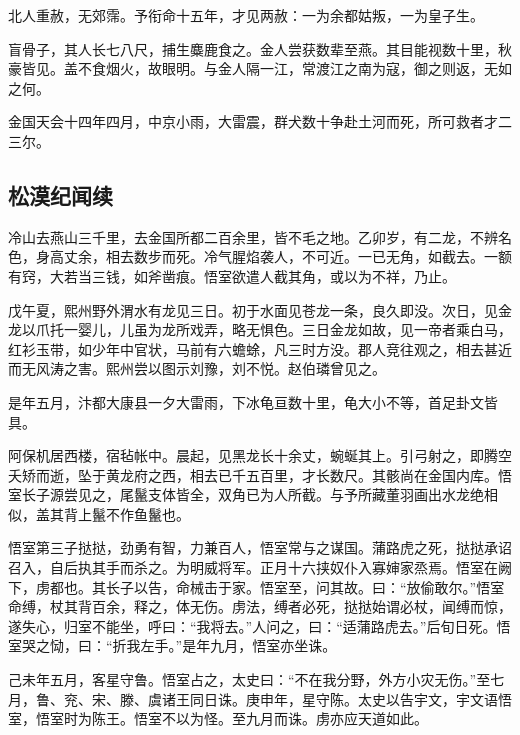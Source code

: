 \documentclass[]{article}
\begin{document}
北人重赦，无郊霈。予衔命十五年，才见两赦：一为余都姑叛，一为皇子生。

盲骨子，其人长七八尺，捕生麋鹿食之。金人尝获数辈至燕。其目能视数十里，秋豪皆见。盖不食烟火，故眼明。与金人隔一江，常渡江之南为寇，御之则返，无如之何。

金国天会十四年四月，中京小雨，大雷震，群犬数十争赴土河而死，所可救者才二三尔。

\hypertarget{header-n17}{%
\subsection{松漠纪闻续}\label{header-n17}}

冷山去燕山三千里，去金国所都二百余里，皆不毛之地。乙卯岁，有二龙，不辨名色，身高丈余，相去数步而死。冷气腥焰袭人，不可近。一已无角，如截去。一额有窍，大若当三钱，如斧凿痕。悟室欲遣人截其角，或以为不祥，乃止。

戊午夏，熙州野外渭水有龙见三日。初于水面见苍龙一条，良久即没。次日，见金龙以爪托一婴儿，儿虽为龙所戏弄，略无惧色。三日金龙如故，见一帝者乘白马，红衫玉带，如少年中官状，马前有六蟾蜍，凡三时方没。郡人竞往观之，相去甚近而无风涛之害。熙州尝以图示刘豫，刘不悦。赵伯璘曾见之。

是年五月，汴都大康县一夕大雷雨，下冰龟亘数十里，龟大小不等，首足卦文皆具。

阿保机居西楼，宿毡帐中。晨起，见黑龙长十余丈，蜿蜒其上。引弓射之，即腾空夭矫而逝，坠于黄龙府之西，相去已千五百里，才长数尺。其骸尚在金国内库。悟室长子源尝见之，尾鬣支体皆全，双角已为人所截。与予所藏董羽画出水龙绝相似，盖其背上鬣不作鱼鬣也。

悟室第三子挞挞，劲勇有智，力兼百人，悟室常与之谋国。蒲路虎之死，挞挞承诏召入，自后执其手而杀之。为明威将军。正月十六挟奴仆入寡婶家烝焉。悟室在阙下，虏都也。其长子以告，命械击于家。悟室至，问其故。曰：``放偷敢尔。''悟室命缚，杖其背百余，释之，体无伤。虏法，缚者必死，挞挞始谓必杖，闻缚而惊，遂失心，归室不能坐，呼曰：``我将去。''人问之，曰：``适蒲路虎去。''后旬日死。悟室哭之恸，曰：``折我左手。''是年九月，悟室亦坐诛。

己未年五月，客星守鲁。悟室占之，太史曰：``不在我分野，外方小灾无伤。''至七月，鲁、兖、宋、滕、虞诸王同日诛。庚申年，星守陈。太史以告宇文，宇文语悟室，悟室时为陈王。悟室不以为怪。至九月而诛。虏亦应天道如此。
\end{document}
